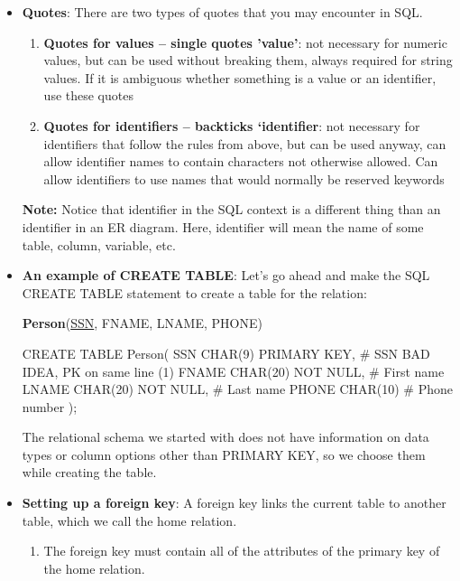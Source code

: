 \documentclass{report}
\begin{document}
\begin{itemize}
\begin{enumerate}
            \end{enumerate}
        \item \textbf{Quotes}: There are two types of quotes that you may encounter in SQL.
            \begin{enumerate}
                \item \textbf{Quotes for values – single quotes 'value'}: not necessary for numeric values, but can be used without breaking them, always required for string values. If it is ambiguous whether something is a value or an identifier, use these quotes
                \item \textbf{Quotes for identifiers – backticks `identifier}: not necessary for identifiers that follow the rules from above, but can be used anyway, can allow identifier names to contain characters not otherwise allowed.  Can allow identifiers to use names that would normally be reserved keywords
            \end{enumerate}
            \bigbreak \noindent 
            \textbf{Note:} Notice that identifier in the SQL context is a different thing than an identifier in an ER diagram. Here, identifier will mean the name of some table, column, variable, etc.
        \item \textbf{An example of CREATE TABLE}: Let’s go ahead and make the SQL CREATE TABLE statement to create a table for the relation:
            \begin{center}
                \textbf{Person}(\underline{SSN}, FNAME, LNAME, PHONE)
            \end{center}
            \bigbreak \noindent 
            \begin{sqlcode}
                CREATE TABLE Person(
                    SSN CHAR(9) PRIMARY KEY, # SSN BAD IDEA, PK on same line (1)
                    FNAME CHAR(20) NOT NULL, # First name
                    LNAME CHAR(20) NOT NULL, # Last name
                    PHONE CHAR(10) # Phone number
                ); 
            \end{sqlcode}
            \bigbreak \noindent 
            The relational schema we started with does not have information on data types or column options other than PRIMARY KEY, so we choose them while creating the table.
        \item \textbf{Setting up a foreign key}: A foreign key links the current table to another table, which we call the home relation.
            \begin{enumerate}
                \item The foreign key must contain all of the attributes of the primary key of the home relation.

\end{enumerate}
\end{itemize}
\end{document}
